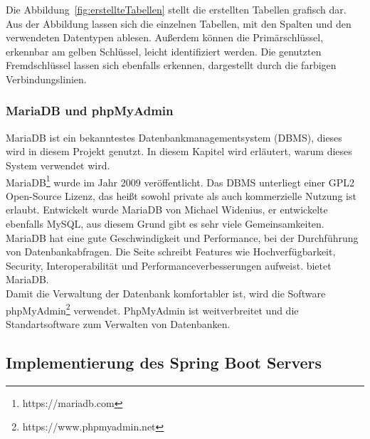 Die Abbildung~\ref{fig:erstellteTabellen} stellt die erstellten Tabellen grafisch dar. Aus der Abbildung lassen sich die einzelnen Tabellen, mit den Spalten und den verwendeten Datentypen ablesen. Außerdem können die Primärschlüssel, erkennbar am gelben Schlüssel, leicht identifiziert werden.
Die genutzten Fremdschlüssel lassen sich ebenfalls erkennen, dargestellt durch die farbigen Verbindungslinien.


\subsubsection{MariaDB und phpMyAdmin}\label{MariaDB und phpMyAdmin}
MariaDB ist ein bekanntestes Datenbankmanagementsystem (DBMS), dieses wird in diesem Projekt genutzt. In diesem Kapitel wird erläutert, warum dieses System verwendet wird.
\\

MariaDB\footnote{https://mariadb.com} wurde im Jahr 2009 veröffentlicht. Das DBMS unterliegt einer GPL2 Open-Source Lizenz, das heißt sowohl private als auch kommerzielle Nutzung ist erlaubt. Entwickelt wurde MariaDB von Michael Widenius, er entwickelte ebenfalls MySQL, aus diesem Grund gibt es sehr viele Gemeinsamkeiten. 
\\
MariaDB hat eine gute Geschwindigkeit und Performance, bei der Durchführung von Datenbankabfragen. Die Seite \cite{DB4} schreibt \grqq Features wie Hochverfügbarkeit, Security, Interoperabilität und Performanceverbesserungen aufweist.\grqq{} bietet MariaDB. 
\\
Damit die Verwaltung der Datenbank komfortabler ist, wird die Software phpMyAdmin\footnote{https://www.phpmyadmin.net} verwendet. PhpMyAdmin ist weitverbreitet und die Standartsoftware zum Verwalten von Datenbanken. 

\subsection{Implementierung des Spring Boot Servers}


